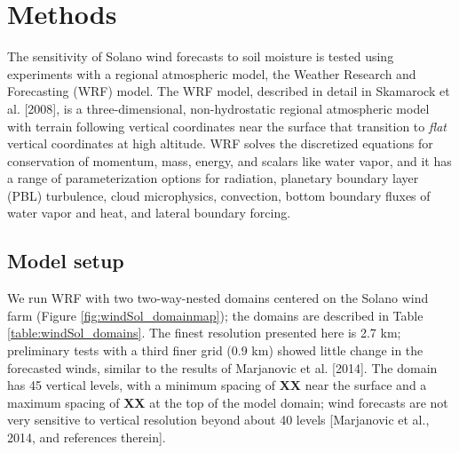 
%
%
%
%
%

\section{Methods}

The sensitivity of Solano wind forecasts to soil moisture is tested using experiments with a regional atmospheric model, the Weather Research and Forecasting (WRF) model.  The WRF model, described in detail in Skamarock et al. [2008], is a three-dimensional, non-hydrostatic regional atmospheric model with terrain following vertical coordinates near the surface that transition to \textit{flat} vertical coordinates at high altitude.  WRF solves the discretized equations for conservation of momentum, mass, energy, and scalars like water vapor, and it has a range of parameterization options for radiation, planetary boundary layer (PBL) turbulence, cloud microphysics, convection, bottom boundary fluxes of water vapor and heat, and lateral boundary forcing.

\subsection{Model setup}

We run WRF with two two-way-nested domains centered on the Solano wind farm (Figure \ref{fig:windSol_domainmap}); the domains are described in Table \ref{table:windSol_domains}.  The finest resolution presented here is 2.7 km; preliminary tests with a third finer grid (0.9 km) showed little change in the forecasted winds, similar to the results of Marjanovic et al. [2014].  The domain has 45 vertical levels, with a minimum spacing of \textbf{XX} near the surface and a maximum spacing of \textbf{XX} at the top of the model domain; wind forecasts are not very sensitive to vertical resolution beyond about 40 levels [Marjanovic et al., 2014, and references therein].

